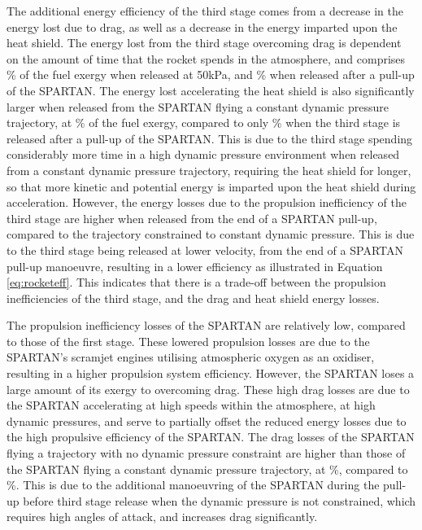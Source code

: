 The additional energy efficiency of the third stage comes from a decrease in the energy lost due to drag, as well as a decrease in the energy imparted upon the heat shield. 
The energy lost from the third stage overcoming drag is dependent on the amount of time that the rocket spends in the atmosphere, and comprises \WDthreeConstqNoReturn \% of the fuel exergy when released at 50kPa, and \WDthreeStandardNoReturn \% when released after a pull-up of the SPARTAN.
The energy lost accelerating the heat shield is also significantly larger when released from the SPARTAN flying a constant dynamic pressure trajectory, at \WHSthreeConstqNoReturn \% of the fuel exergy, compared to only \WHSthreeStandardNoReturn \% when the third stage is released after a pull-up of the SPARTAN. This is due to the third stage spending considerably more time in a high dynamic pressure environment when released from a constant dynamic pressure trajectory, requiring the heat shield for longer, so that more kinetic and potential energy is imparted upon the heat shield during acceleration. However, the energy losses due to the propulsion inefficiency of the third stage are higher when released from the end of a SPARTAN pull-up, compared to the trajectory constrained to constant dynamic pressure. This is due to the third stage being released at lower velocity, from the end of a SPARTAN pull-up manoeuvre, resulting in a lower efficiency as illustrated in Equation \ref{eq:rocketeff}. This indicates that there is a trade-off between the propulsion inefficiencies of the third stage, and the drag and heat shield energy losses.


The propulsion inefficiency losses of the SPARTAN are relatively low, compared to those of the first stage.
These lowered propulsion losses are due to the SPARTAN's scramjet engines utilising atmospheric oxygen as an oxidiser, resulting in a higher propulsion system efficiency.
 However, the SPARTAN loses a large amount of its exergy to overcoming drag. These high drag losses are due to the SPARTAN accelerating at high speeds within the atmosphere, at high dynamic pressures, and serve to partially offset the reduced energy losses due to the high propulsive efficiency of the SPARTAN. 
 The drag losses of the SPARTAN flying a trajectory with no dynamic pressure constraint are higher than those of the SPARTAN flying a constant dynamic pressure trajectory, at \WDsecondStandardNoReturn\%, compared to \WDsecondConstqNoReturn\%. This is due to the additional manoeuvring of the SPARTAN during the pull-up before third stage release when the dynamic pressure is not constrained, which requires high angles of attack, and increases drag significantly. 
 
